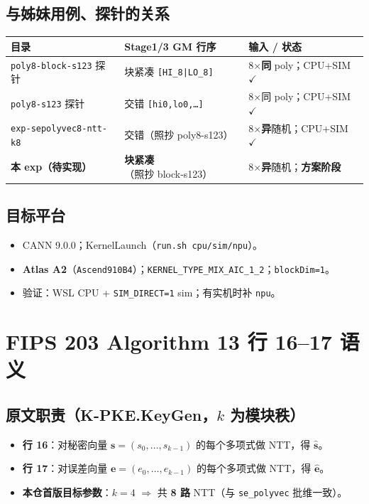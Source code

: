 \documentclass[UTF8,a4paper,11pt]{ctexart}
\begin{document}
\subsection{与姊妹用例、探针的关系}
\begin{table}[h]
  \centering
  \begin{tabular}{@{}L{4.2cm}L{5.2cm}L{4.8cm}@{}}
    \toprule
    目录 & Stage1/3 GM 行序 & 输入 / 状态 \\
    \midrule
    \texttt{poly8-block-s123} 探针 & 块紧凑 \texttt{[HI\_8|LO\_8]} & 8$\times$\textbf{同} poly；CPU+SIM $\checkmark$ \\
    \texttt{poly8-s123} 探针 & 交错 \texttt{[hi0,lo0,\ldots]} & 8$\times$同 poly；CPU+SIM $\checkmark$ \\
    \texttt{exp-sepolyvec8-ntt-k8} & 交错（照抄 poly8-s123） & 8$\times$\textbf{异}随机；CPU+SIM $\checkmark$ \\
    \textbf{本 exp（待实现）} & \textbf{块紧凑}（照抄 block-s123） & 8$\times$\textbf{异}随机；\textbf{方案阶段} \\
    \bottomrule
  \end{tabular}
\end{table}

\subsection{目标平台}
\begin{itemize}
  \item CANN 9.0.0；KernelLaunch（\texttt{run.sh cpu/sim/npu}）。
  \item \textbf{Atlas A2}（\texttt{Ascend910B4}）；\texttt{KERNEL\_TYPE\_MIX\_AIC\_1\_2}；\texttt{blockDim=1}。
  \item 验证：WSL CPU + \texttt{SIM\_DIRECT=1} sim；有实机时补 \texttt{npu}。
\end{itemize}

\section{FIPS 203 Algorithm 13 行 16–17 语义}
\label{sec:alg13}

\subsection{原文职责（K-PKE.KeyGen，$k$ 为模块秩）}
\begin{itemize}
  \item \textbf{行 16}：对秘密向量 $\mathbf{s}=(s_0,\ldots,s_{k-1})$ 的每个多项式做 NTT，得 $\hat{\mathbf{s}}$。
  \item \textbf{行 17}：对误差向量 $\mathbf{e}=(e_0,\ldots,e_{k-1})$ 的每个多项式做 NTT，得 $\hat{\mathbf{e}}$。
  \item \textbf{本仓首版目标参数}：$k{=}4$ $\Rightarrow$ 共 \textbf{8 路} NTT（与 \texttt{se\_polyvec} 批维一致）。
\end{itemize}
\end{document}
